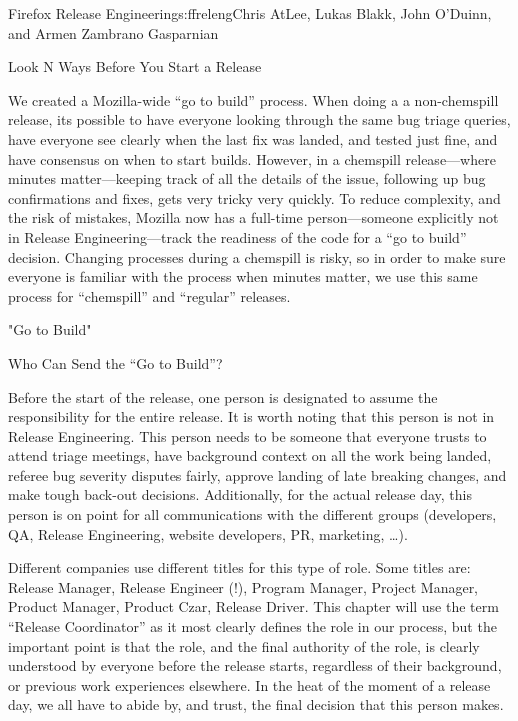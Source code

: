\begin{aosachapter}{Firefox Release Engineering}{s:ffreleng}{Chris AtLee, Lukas Blakk, John O'Duinn, and Armen Zambrano Gasparnian}
\begin{aosasect1}{Look N Ways Before You Start a Release}
\begin{aosaenumerate}
\item We created a Mozilla-wide ``go to build'' process. When doing a
  a non-chemspill release, its possible to have everyone looking
  through the same bug triage queries, have everyone see clearly when
  the last fix was landed, and tested just fine, and have consensus on
  when to start builds. However, in a chemspill release---where
  minutes matter---keeping track of all the details of the issue,
  following up bug confirmations and fixes, gets very tricky very
  quickly.  To reduce complexity, and the risk of mistakes, Mozilla
  now has a full-time person---someone explicitly not in Release
  Engineering---track the readiness of the code for a ``go to build''
  decision.  Changing processes during a chemspill is risky, so in
  order to make sure everyone is familiar with the process when
  minutes matter, we use this same process for ``chemspill'' and
  ``regular'' releases.

\end{aosaenumerate}


\end{aosasect1}

\begin{aosasect1}{"Go to Build"}

\begin{aosasect2}{Who Can Send the ``Go to Build''?}

Before the start of the release, one person is designated to assume
the responsibility for the entire release. It is worth noting that
this person is not in Release Engineering. This person needs to be
someone that everyone trusts to attend triage meetings, have
background context on all the work being landed, referee bug severity
disputes fairly, approve landing of late breaking changes, and make
tough back-out decisions.  Additionally, for the actual release day,
this person is on point for all communications with the different
groups (developers, QA, Release Engineering, website developers, PR,
marketing, {\ldots}).

Different companies use different titles for this type of role.  Some
titles are: Release Manager, Release Engineer (!), Program Manager,
Project Manager, Product Manager, Product Czar, Release Driver. This
chapter will use the term ``Release Coordinator'' as it most clearly
defines the role in our process, but the important point is that the
role, and the final authority of the role, is clearly understood by
everyone before the release starts, regardless of their background, or
previous work experiences elsewhere. In the heat of the moment of a
release day, we all have to abide by, and trust, the final decision
that this person makes.


\end{aosasect2}
\end{aosasect1}
\end{aosachapter}
